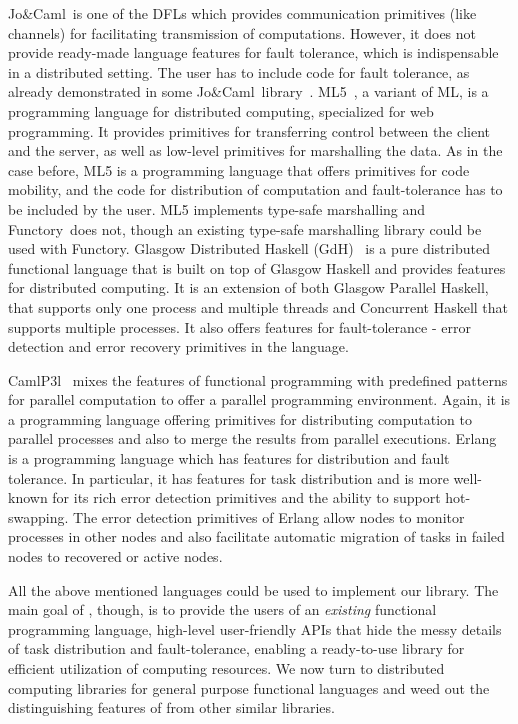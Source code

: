 \documentclass{llncs}
\newcommand{\functory}{\textsf{Functory}}
\newcommand{\JoCaml}{Jo{\&\!}Caml}
\begin{document}
\JoCaml\ is one of the DFLs which provides communication primitives
(like channels) for facilitating transmission of
computations. However, it does not provide ready-made language
features for fault tolerance, which is indispensable in a distributed
setting. The user has to include code for fault tolerance, as already
demonstrated in some \JoCaml\
library~\cite{mandel2008}. ML5~\cite{ML5}, a variant of ML, is a
programming language for distributed computing, specialized for web
programming. It provides primitives for transferring control between
the client and the server, as well as low-level primitives for
marshalling the data. As in the case before, ML5 is a programming
language that offers primitives for code mobility, and the code for
distribution of computation and fault-tolerance has to be included by
the user.  ML5 implements type-safe marshalling and
\functory\ does not, though an existing type-safe marshalling library
could be used with \functory. 
Glasgow Distributed Haskell (GdH)~\cite{GdH} is a pure distributed
functional language that is built on top of Glasgow Haskell and
provides features for distributed computing. It is an extension of
both Glasgow Parallel Haskell, that supports only one process and
multiple threads and Concurrent Haskell that supports multiple
processes. It also offers features for fault-tolerance - error
detection and error recovery primitives in the
language. 

CamlP3l~\cite{camlP3l} mixes the features of functional programming
with predefined patterns for parallel computation to offer a parallel
programming environment. Again, it is a programming language offering
primitives for distributing computation to parallel processes and also
to merge the results from parallel executions. Erlang~\cite{erlang} is
a programming language which has features for distribution and fault
tolerance. In particular, it has features for task distribution and is
more well-known for its rich error detection primitives and the
ability to support hot-swapping. The error detection primitives of
Erlang allow nodes to monitor processes in other nodes and also
facilitate automatic migration of tasks in failed nodes to recovered
or active nodes.

All the above mentioned languages could be used to implement our
library.  The main goal of \of{Functory}, though, is to provide the
users of an \emph{existing} functional programming language, high-level
user-friendly APIs that hide the messy details of task distribution
and fault-tolerance, enabling a ready-to-use library for efficient
utilization of computing resources.
We now turn to distributed computing libraries for general purpose
functional languages and weed out the distinguishing features of
\of{Functory} from other similar libraries.
\end{document}
